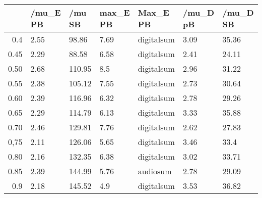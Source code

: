 \begin{table}[ht]
\centering
\begin{tabular}{rllllll}
  \hline
 & /mu\_E PB & /mu SB & max\_E PB & Max\_E PB & /mu\_D pB & /mu\_D SB \\ 
  \hline
0.4 & 2.55 & 98.86 & 7.69 & digitalsum & 3.09 & 35.36 \\ 
  0.45 & 2.29 & 88.58 & 6.58 & digitalsum & 2.41 & 24.11 \\ 
  0.50 & 2.68 & 110.95 & 8.5 & digitalsum & 2.96 & 31.22 \\ 
  0.55 & 2.38 & 105.12 & 7.55 & digitalsum & 2.73 & 30.64 \\ 
  0.60 & 2.39 & 116.96 & 6.32 & digitalsum & 2.78 & 29.26 \\ 
  0.65 & 2.29 & 114.79 & 6.13 & digitalsum & 3.33 & 35.88 \\ 
  0.70 & 2.46 & 129.81 & 7.76 & digitalsum & 2.62 & 27.83 \\ 
  0,75 & 2.11 & 126.06 & 5.65 & digitalsum & 3.46 & 33.4 \\ 
  0.80 & 2.16 & 132.35 & 6.38 & digitalsum & 3.02 & 33.71 \\ 
  0.85 & 2.39 & 144.99 & 5.76 & audiosum & 2.78 & 29.09 \\ 
  0.9 & 2.18 & 145.52 & 4.9 & digitalsum & 3.53 & 36.82 \\ 
   \hline
\end{tabular}
\end{table}
